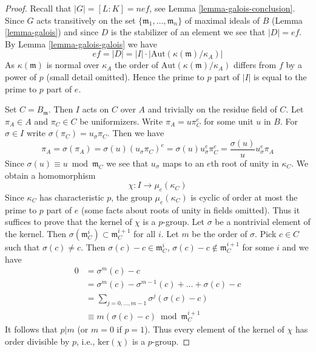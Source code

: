 \begin{proof}
Recall that $|G| = [L : K] = nef$, see Lemma \ref{lemma-galois-conclusion}.
Since $G$ acts transitively on the set
$\{\mathfrak m_1, \ldots, \mathfrak m_n\}$ of maximal ideals of $B$
(Lemma \ref{lemma-galois})
and since $D$ is the stabilizer of an element we see that $|D| = ef$.
By Lemma \ref{lemma-galois-galois} we have
$$
ef = |D| = |I| \cdot |\text{Aut}(\kappa(\mathfrak m)/\kappa_A)|
$$
As $\kappa(\mathfrak m)$ is normal over $\kappa_A$ the order of
$\text{Aut}(\kappa(\mathfrak m)/\kappa_A)$ differs from $f$ by
a power of $p$ (small detail omitted). Hence the prime to $p$ part
of $|I|$ is equal to the prime to $p$ part of $e$.

\medskip\noindent
Set $C = B_\mathfrak m$. Then $I$ acts on $C$ over $A$ and trivially
on the residue field of $C$. Let $\pi_A \in A$ and $\pi_C \in C$ be
uniformizers. Write $\pi_A = u \pi_C^e$ for some unit $u$ in $B$.
For $\sigma \in I$ write $\sigma(\pi_C) = u_\sigma \pi_C$.
Then we have
$$
\pi_A = \sigma(\pi_A) = \sigma(u) (u_\sigma \pi_C)^e
= \sigma(u) u_\sigma^e \pi_C^e = \frac{\sigma(u)}{u} u_\sigma^e \pi_A
$$
Since $\sigma(u) \equiv u \bmod \mathfrak m_C$ we see that $u_\sigma$
maps to an $e$th root of unity in $\kappa_C$. We obtain a homomorphism
$$
\chi : I \longrightarrow \mu_e(\kappa_C)
$$
Since $\kappa_C$ has characteristic $p$, the group $\mu_e(\kappa_C)$
is cyclic of order at most the prime to $p$ part of $e$ (some facts about
roots of unity in fields omitted). Thus it suffices to prove that the
kernel of $\chi$ is a $p$-group. Let $\sigma$ be a nontrivial element of
the kernel. Then $\sigma(\mathfrak m_C^i) \subset \mathfrak m_C^{i + 1}$
for all $i$. Let $m$ be the order of $\sigma$. Pick $c \in C$ such
that $\sigma(c) \not = c$. Then $\sigma(c) - c \in \mathfrak m_C^i$,
$\sigma(c) - c \not \in \mathfrak m_C^{i + 1}$ for some $i$ and
we have
\begin{align*}
0
& =
\sigma^m(c) - c \\
& =
\sigma^m(c) - \sigma^{m - 1}(c) + \ldots + \sigma(c) - c \\
& =
\sum\nolimits_{j = 0, \ldots, m - 1} \sigma^j(\sigma(c) - c) \\
& \equiv
m(\sigma(c) - c) \bmod \mathfrak m_C^{i + 1}
\end{align*}
It follows that $p | m$ (or $m = 0$ if $p = 1$). Thus every element of the
kernel of $\chi$ has order divisible by $p$, i.e., $\text{ker}(\chi)$
is a $p$-group.
\end{proof}

